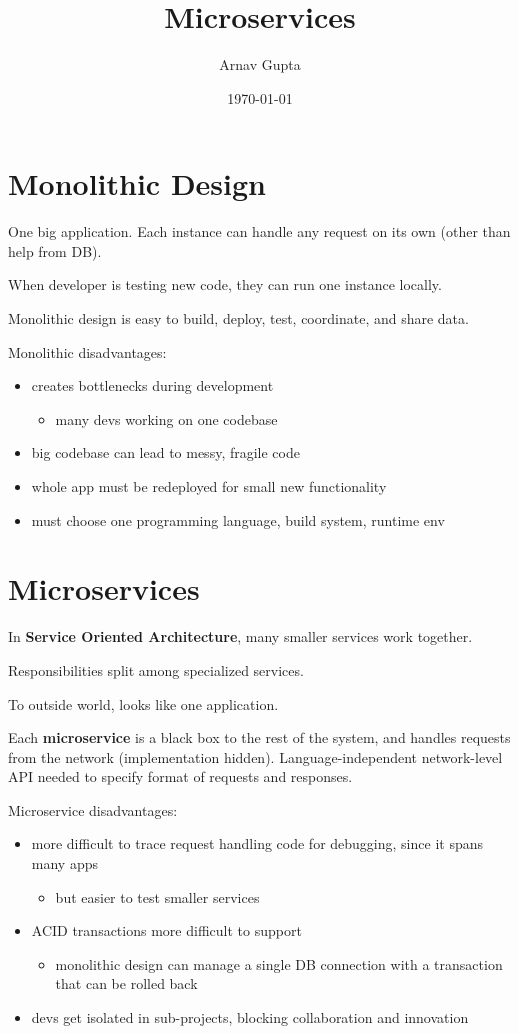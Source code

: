 \documentclass[11pt]{article}
\author{Arnav Gupta}
\date{\today}
\title{Microservices}
\begin{document}
\maketitle
\tableofcontents

\section{Monolithic Design}
\label{sec:org62f80eb}
One big application.
Each instance can handle any request on its own (other than help from DB).

When developer is testing new code, they can run one instance locally.

Monolithic design is easy to build, deploy, test, coordinate, and share data.

Monolithic disadvantages:
\begin{itemize}
\item creates bottlenecks during development
\begin{itemize}
\item many devs working on one codebase
\end{itemize}
\item big codebase can lead to messy, fragile code
\item whole app must be redeployed for small new functionality
\item must choose one programming language, build system, runtime env
\end{itemize}
\section{Microservices}
\label{sec:orgb39c896}
In \textbf{Service Oriented Architecture}, many smaller services work together.

Responsibilities split among specialized services.

To outside world, looks like one application.

Each \textbf{microservice} is a black box to the rest of the system, and handles requests from the network
(implementation hidden).
Language-independent network-level API needed to specify format of requests and responses.

Microservice disadvantages:
\begin{itemize}
\item more difficult to trace request handling code for debugging, since it spans many apps
\begin{itemize}
\item but easier to test smaller services
\end{itemize}
\item ACID transactions more difficult to support
\begin{itemize}
\item monolithic design can manage a single DB connection with a transaction that can be rolled back
\end{itemize}
\item devs get isolated in sub-projects, blocking collaboration and innovation
\end{itemize}
\end{document}
